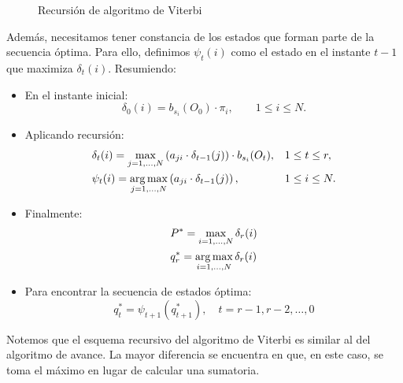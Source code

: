 \begin{figure}[H]
    \caption{Recursión de algoritmo de Viterbi}
    \label{fig:Viterbi}
\end{figure}

Además, necesitamos tener constancia de los estados que forman parte de la secuencia óptima. Para ello, definimos $\psi_t(i)$ como el estado en el instante $t-1$ que maximiza $\delta_t(i)$. Resumiendo:
\begin{itemize}
    \item En el instante inicial:
    \begin{equation*}
        \delta_0(i)=b_{s_i}(O_0)\cdot\pi_i, \qquad 1\leq i\leq N.
    \end{equation*}
    \item Aplicando recursión:
    \begin{align*}
        &\delta_t(i)=\max_{j=1,\dots,N}\left(a_{ji}\cdot\delta_{t-1}(j)\right) \cdot b_{s_i}(O_t), && 1\leq t\leq r, \\
        &\psi_t(i)=\operatorname*{\arg\max}_{j=1,\dots,N}\left(a_{ji}\cdot\delta_{t-1}(j)\right),  &&  1\leq i\leq N.
    \end{align*}
    \item Finalmente:
    \begin{align*}
        & P^* = \max_{i=1,\dots,N} \delta_r(i)\\
        & q_r^*=\operatorname*{\arg\max}_{i=1,\dots,N} \delta_r(i)
    \end{align*} 
    \item Para encontrar la secuencia de estados óptima:
    \[q_t^*=\psi_{t+1}(q_{t+1}^*), \quad t=r-1,r-2,\dots,0\]
\end{itemize}
Notemos que el esquema recursivo del algoritmo de Viterbi es similar al del algoritmo de avance. La mayor diferencia se encuentra en que, en este caso, se toma el máximo en lugar de calcular una sumatoria.

